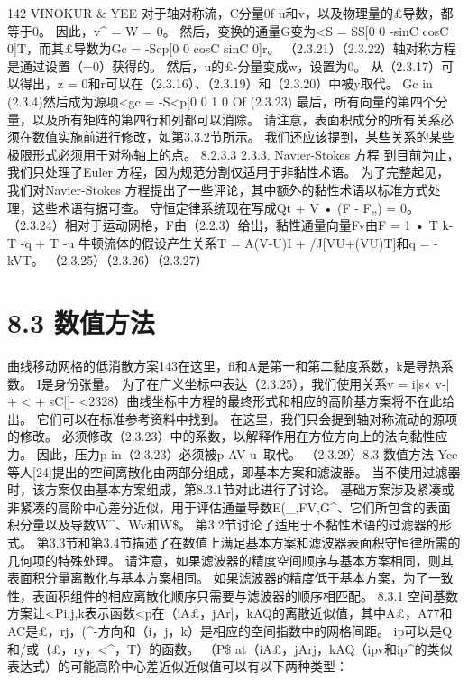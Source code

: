 \documentclass[UTF8,11pt,a4paper,openany,fontset=fandol]{ctexbook}
\begin{document}
142 VINOKUR \& YEE 对于轴对称流，C分量0f u和v，以及物理量的£导数，都等于0。 因此，v\textasciicircum{} = W = 0。 然后，变换的通量G变为<S = SS[0 0 -sinC cosC 0]T，而其£导数为Gc = -Scp[0 0 cosC sinC 0]r。 （2.3.21）（2.3.22）轴对称方程是通过设置（=0）获得的。 然后，u的£-分量变成w，设置为0。 从（2.3.17）可以得出，z = 0和r可以在（2.3.16）、（2.3.19）和（2.3.20）中被y取代。 Gc in (2.3.4)然后成为源项<gc = -S<p[0 0 1 0 Of (2.3.23) 最后，所有向量的第四个分量，以及所有矩阵的第四行和列都可以消除。 请注意，表面积成分的所有关系必须在数值实施前进行修改，如第3.3.2节所示。 我们还应该提到，某些关系的某些极限形式必须用于对称轴上的点。 8.2.3.3 2.3.3. Navier-Stokes 方程 到目前为止，我们只处理了Euler 方程，因为规范分割仅适用于非黏性术语。 为了完整起见，我们对Navier-Stokes 方程提出了一些评论，其中额外的黏性术语以标准方式处理，这些术语有据可查。 守恒定律系统现在写成Qt + V • (F - F„) = 0。 （2.3.24）相对于运动网格，F由（2.2.3）给出，黏性通量向量Fv由F = 1 • T k-T -q + T -u 牛顿流体的假设产生关系T = A(V-U)I + /J[VU+(VU)T]和q = -kVT。 （2.3.25）（2.3.26）（2.3.27）

\section{8.3 数值方法}
曲线移动网格的低消散方案143在这里，fi和A是第一和第二黏度系数，k是导热系数。 I是身份张量。 为了在广义坐标中表达（2.3.25），我们使用关系v = i[s« v-| + < + sC|]- <2328）曲线坐标中方程的最终形式和相应的高阶基方案将不在此给出。 它们可以在标准参考资料中找到。 在这里，我们只会提到轴对称流动的源项的修改。 必须修改（2.3.23）中的系数，以解释作用在方位方向上的法向黏性应力。 因此，压力p in（2.3.23）必须被p-AV-u--取代。 （2.3.29）8.3 数值方法 Yee等人[24]提出的空间离散化由两部分组成，即基本方案和滤波器。 当不使用过滤器时，该方案仅由基本方案组成，第8.3.1节对此进行了讨论。 基础方案涉及紧凑或非紧凑的高阶中心差分近似，用于评估通量导数E(\_,FV,G\textasciicircum{}、它们所包含的表面积分量以及导数W\textasciicircum{}、Wv和W\$。 第3.2节讨论了适用于不黏性术语的过滤器的形式。 第3.3节和第3.4节描述了在数值上满足基本方案和滤波器表面积守恒律所需的几何项的特殊处理。 请注意，如果滤波器的精度空间顺序与基本方案相同，则其表面积分量离散化与基本方案相同。 如果滤波器的精度低于基本方案，为了一致性，表面积组件的相应离散化顺序只需要与滤波器的顺序相匹配。 8.3.1 空间基数方案让<Pi,j,k表示函数<p在（iA£，jAr]，kAQ的离散近似值，其中A£，A77和AC是£，rj，(\textasciicircum{}-方向和（i，j，k）是相应的空间指数中的网格间距。 ip可以是Q和/或（£，ry，<\textasciicircum{}，T）的函数。 （P\$ at（iA£，jArj，kAQ（ipv和ip\textasciicircum{}的类似表达式）的可能高阶中心差近似近似值可以有以下两种类型：
\end{document}

